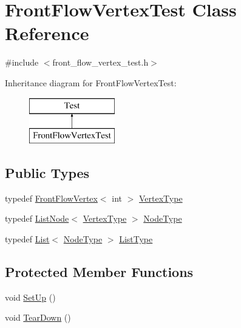 \hypertarget{class_front_flow_vertex_test}{}\section{Front\+Flow\+Vertex\+Test Class Reference}
\label{class_front_flow_vertex_test}


{\ttfamily \#include $<$front\+\_\+flow\+\_\+vertex\+\_\+test.\+h$>$}

Inheritance diagram for Front\+Flow\+Vertex\+Test\+:\begin{figure}[H]
\begin{center}
\leavevmode
\includegraphics[height=2.000000cm]{class_front_flow_vertex_test}
\end{center}
\end{figure}
\subsection*{Public Types}
\begin{DoxyCompactItemize}
\item 
typedef \hyperlink{struct_introduction_to_algorithm_1_1_graph_algorithm_1_1_front_flow_vertex}{Front\+Flow\+Vertex}$<$ int $>$ \hyperlink{class_front_flow_vertex_test_a0eefc91d4672952fe46aafe55b41d195}{Vertex\+Type}
\item 
typedef \hyperlink{struct_introduction_to_algorithm_1_1_graph_algorithm_1_1_list_node}{List\+Node}$<$ \hyperlink{class_front_flow_vertex_test_a0eefc91d4672952fe46aafe55b41d195}{Vertex\+Type} $>$ \hyperlink{class_front_flow_vertex_test_a80f3e381f6911872f7a4359ceff966bf}{Node\+Type}
\item 
typedef \hyperlink{struct_introduction_to_algorithm_1_1_graph_algorithm_1_1_list}{List}$<$ \hyperlink{class_front_flow_vertex_test_a80f3e381f6911872f7a4359ceff966bf}{Node\+Type} $>$ \hyperlink{class_front_flow_vertex_test_ac30f272d98796ffce519f894f111fcaa}{List\+Type}
\end{DoxyCompactItemize}
\subsection*{Protected Member Functions}
\begin{DoxyCompactItemize}
\item 
void \hyperlink{class_front_flow_vertex_test_a8dfe07d5a92c681dcaa64ecc7dab5e2f}{Set\+Up} ()
\item 
void \hyperlink{class_front_flow_vertex_test_a653d242a450fdfd6eed74c6540154681}{Tear\+Down} ()
\end{DoxyCompactItemize}
